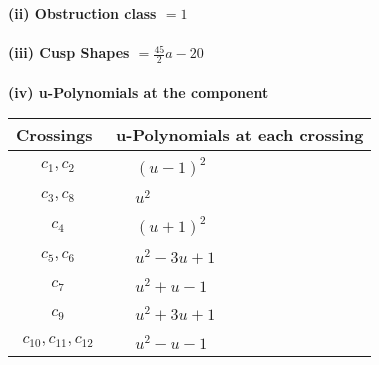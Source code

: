 \documentclass[1p]{elsarticle_modified}
\theoremstyle{definition}
\begin{document}
\flushleft \textbf{(ii) Obstruction class $= 1$}\\~\\
\flushleft \textbf{(iii) Cusp Shapes $= \frac{45}{2} a-20$}\\~\\
\newpage\renewcommand{\arraystretch}{1}
\flushleft \textbf{(iv) u-Polynomials at the component}\newline \\
\begin{tabular}{m{50pt}|m{274pt}}
Crossings & \hspace{64pt}u-Polynomials at each crossing \\
\hline $$\begin{aligned}c_{1},c_{2}\end{aligned}$$&$\begin{aligned}
&(u-1)^2
\end{aligned}$\\
\hline $$\begin{aligned}c_{3},c_{8}\end{aligned}$$&$\begin{aligned}
&u^2
\end{aligned}$\\
\hline $$\begin{aligned}c_{4}\end{aligned}$$&$\begin{aligned}
&(u+1)^2
\end{aligned}$\\
\hline $$\begin{aligned}c_{5},c_{6}\end{aligned}$$&$\begin{aligned}
&u^2-3 u+1
\end{aligned}$\\
\hline $$\begin{aligned}c_{7}\end{aligned}$$&$\begin{aligned}
&u^2+u-1
\end{aligned}$\\
\hline $$\begin{aligned}c_{9}\end{aligned}$$&$\begin{aligned}
&u^2+3 u+1
\end{aligned}$\\
\hline $$\begin{aligned}c_{10},c_{11},c_{12}\end{aligned}$$&$\begin{aligned}
&u^2- u-1
\end{aligned}$\\
\hline
\end{tabular}\\~\\
\end{document}
